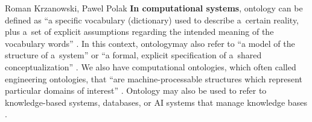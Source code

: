 \begin{artengenv2auth}{Roman Krzanowski, Pawel Polak}
\textbf{In computational systems}, ontology can be defined as ``a specific vocabulary (dictionary) used to describe a~certain reality, plus a~set of explicit assumptions regarding the intended meaning of the vocabulary words''
\parencites[see][]{guarino_ontologies_1995}[][]{guarino_what_2009}. %
 In this context, ontologymay also refer to ``a model of the structure of a~system'' 
\parencite[][]{guarino_what_2009} %
 or ``a formal, explicit specification of a~shared conceptualization'' 
\parencite[][]{studer_knowledge_1998}. %
 We also have computational ontologies, which often called engineering ontologies, that ``are machine-processable structures which represent particular domains of interest'' 
\parencite[][]{husakova_formal_2020}. %
 Ontology may also be used to refer to knowledge-based systems, databases, or AI systems that manage knowledge bases 
\parencites[see the discussions of][]{sharman_ontologies_2007}[][]{staab_handbook_2009}[][]{garbacz_formal_2014}[][]{husakova_formal_2020}.%



\end{artengenv2auth}
